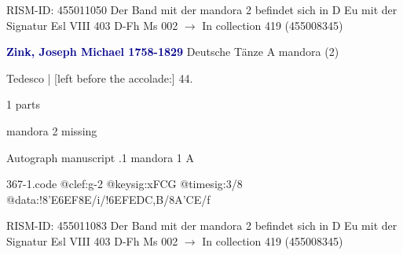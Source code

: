 \documentclass[twocolumn]{book}
\begin{document}
\newline RISM-ID: 455011050
\newline Der Band mit der mandora 2 befindet sich in D Eu mit der Signatur Esl VIII 403
\newline D-Fh  Ms 002
\newline $\rightarrow$ In collection 419 (455008345)

\newline \par \vspace{7pt} \textcolor{darkblue}{\textbf{Zink, Joseph Michael  1758-1829}}
\newline Deutsche Tänze  A  
\newline mandora (2)
\newline \begin{itshape}[f.25v, at left:] Tedesco | [left before the accolade:] 44.\end{itshape} 
\newline \textcolor{darkblue}{}  1 parts  
\newline \begin{small} mandora 2 missing\end{small} 
\newline Autograph manuscript
.1  mandora 1  A  
\begin{filecontents*}{367-1.code}
@clef:g-2
@keysig:xFCG
@timesig:3/8
@data:!{8'E6EF}8E/i/!{6EF}{ED}{C,B}/8A'CE/f
\end{filecontents*}
\newline
%

\newline RISM-ID: 455011083
\newline Der Band mit der mandora 2 befindet sich in D Eu mit der Signatur Esl VIII 403
\newline D-Fh  Ms 002
\newline $\rightarrow$ In collection 419 (455008345)
\end{document}
